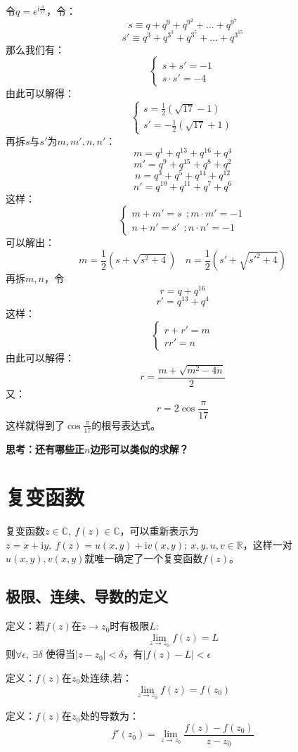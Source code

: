 令$q=e^{\mathrm{i}\frac{\pi}{17}}$，令：
\[s \equiv q+q^9+q^{9^2}+...+q^{9^7}\]
\[s'\equiv q^3+q^{3^3}+q^{3^5}+...+q^{3^{15}}\]
那么我们有：
\[
\left\{
\begin{array}{c}
s+s'=-1\\
s\cdot s'=-4
\end{array}
\right.
\]
由此可以解得：
\[
\left\{
\begin{array}{c}
s = \frac{1}{2}(\sqrt{17}-1)\\
s'= -\frac{1}{2}(\sqrt{17}+1)
\end{array}
\right.
\]
再拆$s$与$s'$为$m,m',n,n'$：
\[m = q^1+q^{13}+q^{16}+q^4\]
\[m' = q^9+q^{15}+q^8+q^2\]
\[n = q^3+q^5+q^{14}+q^{12}\]
\[n' = q^{10}+q^{11}+q^7+q^6\]
这样：
\[
\left\{
\begin{array}{l}
m+m' = s \ \ ;m\cdot m'=-1\\
n+n' = s' \ \ ;n\cdot n'=-1
\end{array}
\right.
\]
可以解出：
\[m = \frac{1}{2}(s+\sqrt{s^2+4})\ \ \ \ n = \frac{1}{2}(s'+\sqrt{s'^2+4})\]
再拆$m,n$，令
\[r = q+q^{16}\]
\[r' = q^{13}+q^4\]
这样：
\[
\left\{
\begin{array}{l}
r+r'=m\\
rr'=n
\end{array}
\right.
\]
由此可以解得：
\[r = \frac{m+\sqrt{m^2-4n}}{2}\]
又：
\[r=2 \cos \frac{\pi}{17}\]
这样就得到了$\cos \frac{\pi}{17}$的根号表达式。

\textbf{思考：还有哪些正$n$边形可以类似的求解？}

\section{复变函数}
复变函数$z\in\mathbb{C},\ f(z)\in\mathbb{C}$，可以重新表示为$z=x+\mathrm{i}y,\ f(z)=u(x,y)+\mathrm{i}v(x,y);\ x,y,u,v\in\mathbb{R}$，这样一对$u(x,y),v(x,y)$就唯一确定了一个复变函数$f(z)$。
\subsection{极限、连续、导数的定义}
定义：若$f(z)$在$z\rightarrow z_0$时有极限$L$:
\[\lim\limits_{z\rightarrow z_0}f(z) = L\]
则$\forall\epsilon,\ \exists\delta$ 使得当$\left|z-z_0\right|<\delta$，有$\left|f(z)-L\right|<\epsilon$

定义：$f(z)$在$z_0$处连续,若：
\begin{equation}
\lim\limits_{z\rightarrow z_0}f(z) = f(z_0)
\end{equation}

定义：$f(z)$在$z_0$处的导数为：
\begin{equation}
f'(z_0) = \lim\limits_{z\rightarrow z_0}\frac{f(z)-f(z_0)}{z-z_0}
\end{equation}

